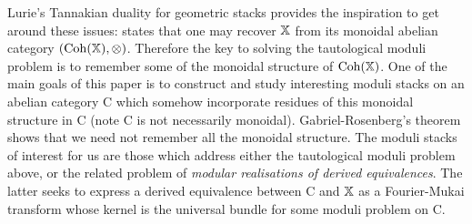 \documentclass[12pt]{amsart}
\begin{document}
Lurie's Tannakian duality for geometric stacks \cite{Lurie} provides the inspiration to get around these issues: \cite[Theorem 5.11]{Lurie} states that one may recover $\mathbb{X}$ from its monoidal abelian category $(\operatorname{Coh}(\mathbb{X}), \otimes)$. Therefore the key to solving the tautological moduli problem is to remember some of the monoidal structure of  $\operatorname{Coh}(\mathbb{X})$. One of the main goals of this paper is to construct and study interesting moduli stacks on an abelian category {\sf C} which somehow incorporate residues of this monoidal structure in {\sf C} (note {\sf C} is not necessarily monoidal). Gabriel-Rosenberg's theorem shows that we need not remember all the monoidal structure. The moduli stacks of interest for us are those which address either the tautological moduli problem above, or the related problem of {\em modular realisations of derived equivalences}. The latter seeks to express a derived equivalence between {\sf C} and $\mathbb{X}$ as a Fourier-Mukai transform whose kernel is the universal bundle for some moduli problem on {\sf C}. 

\end{document}
